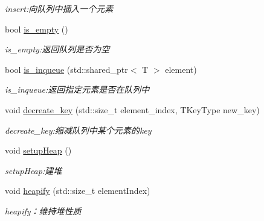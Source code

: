 \begin{DoxyCompactItemize}
\begin{DoxyCompactList}\small\item\em insert\+:向队列中插入一个元素 \end{DoxyCompactList}\item 
bool \hyperlink{class_introduction_to_algorithm_1_1_queue_algorithm_1_1_min_queue_a1b484baf6cd011a4b91aa77a644e5a44}{is\+\_\+empty} ()
\begin{DoxyCompactList}\small\item\em is\+\_\+empty\+:返回队列是否为空 \end{DoxyCompactList}\item 
bool \hyperlink{class_introduction_to_algorithm_1_1_queue_algorithm_1_1_min_queue_ab905b477bfd6ae685a780586f0364050}{is\+\_\+inqueue} (std\+::shared\+\_\+ptr$<$ T $>$ element)
\begin{DoxyCompactList}\small\item\em is\+\_\+inqueue\+:返回指定元素是否在队列中 \end{DoxyCompactList}\item 
void \hyperlink{class_introduction_to_algorithm_1_1_queue_algorithm_1_1_min_queue_aa934049abcfedd59fa9ffe6d91fea30c}{decreate\+\_\+key} (std\+::size\+\_\+t element\+\_\+index, T\+Key\+Type new\+\_\+key)
\begin{DoxyCompactList}\small\item\em decreate\+\_\+key\+:缩减队列中某个元素的{\ttfamily key} \end{DoxyCompactList}\item 
void \hyperlink{class_introduction_to_algorithm_1_1_queue_algorithm_1_1_min_queue_a9a432c7c167a4f9a56c2988cfdc04620}{setup\+Heap} ()
\begin{DoxyCompactList}\small\item\em setup\+Heap\+:建堆 \end{DoxyCompactList}\item 
void \hyperlink{class_introduction_to_algorithm_1_1_queue_algorithm_1_1_min_queue_a4ddfab80f781d5b5f7544164bf266f82}{heapify} (std\+::size\+\_\+t element\+Index)
\begin{DoxyCompactList}\small\item\em heapify：维持堆性质 \end{DoxyCompactList}\end{DoxyCompactItemize}
